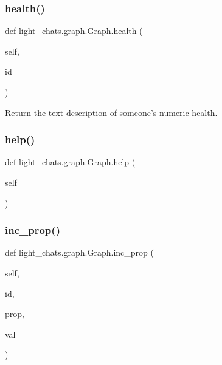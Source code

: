 \subsubsection{\texorpdfstring{health()}{health()}}
{\footnotesize\ttfamily def light\+\_\+chats.\+graph.\+Graph.\+health (\begin{DoxyParamCaption}\item[{}]{self,  }\item[{}]{id }\end{DoxyParamCaption})}

\begin{DoxyVerb}Return the text description of someone's numeric health.
\end{DoxyVerb}
 \mbox{\label{classlight__chats_1_1graph_1_1Graph_a6a6d39a24244430a899bbc0b752baf25}} 
\subsubsection{\texorpdfstring{help()}{help()}}
{\footnotesize\ttfamily def light\+\_\+chats.\+graph.\+Graph.\+help (\begin{DoxyParamCaption}\item[{}]{self }\end{DoxyParamCaption})}

\mbox{\label{classlight__chats_1_1graph_1_1Graph_a871d833484089923fa5d1d4bb357ec7a}} 
\subsubsection{\texorpdfstring{inc\+\_\+prop()}{inc\_prop()}}
{\footnotesize\ttfamily def light\+\_\+chats.\+graph.\+Graph.\+inc\+\_\+prop (\begin{DoxyParamCaption}\item[{}]{self,  }\item[{}]{id,  }\item[{}]{prop,  }\item[{}]{val = {} }\end{DoxyParamCaption})}

